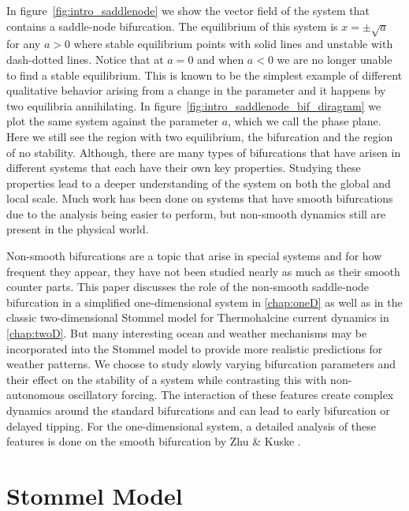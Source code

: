 In figure~\ref{fig:intro_saddlenode} we show the vector field of the system that contains a saddle-node bifurcation. The equilibrium of this system is $x=\pm \sqrt{a}$ for any $a>0$ where stable equilibrium points with solid lines and unstable with dash-dotted lines. Notice that at $a=0$ and when $a<0$ we are no longer unable to find a stable equilibrium. This is known to be the simplest example of different qualitative behavior arising from a change in the parameter and it happens by two equilibria annihilating. In figure~\ref{fig:intro_saddlenode_bif_diragram} we plot the same system against the parameter $a$, which we call the phase plane. Here we still see the region with two equilibrium, the bifurcation and the region of no stability. Although, there are many types of bifurcations that have arisen in different systems that each have their own key properties. Studying these properties lead to a deeper understanding of the system on both the global and local scale. Much work has been done on systems that have smooth bifurcations due to the analysis being easier to perform, but non-smooth dynamics still are present in the physical world.

Non-smooth bifurcations are a topic that arise in special systems and for how frequent they appear, they have not been studied nearly as much as their smooth counter parts. This paper discusses the role of the non-smooth saddle-node bifurcation in a simplified one-dimensional system in \autoref{chap:oneD} as well as in the classic two-dimensional Stommel model for Thermohalcine current dynamics in \autoref{chap:twoD}. But many interesting ocean and weather mechanisms may be incorporated into the Stommel model to provide more realistic predictions for weather patterns. We choose to study slowly varying bifurcation parameters and their effect on the stability of a system while contrasting this with non-autonomous oscillatory forcing. The interaction of these features create complex dynamics around the standard bifurcations and can lead to early bifurcation or delayed tipping. For the one-dimensional system, a detailed analysis of these features is done on the smooth bifurcation by Zhu \& Kuske \cite{zhu2015tipping}.

\section*{Stommel Model}

